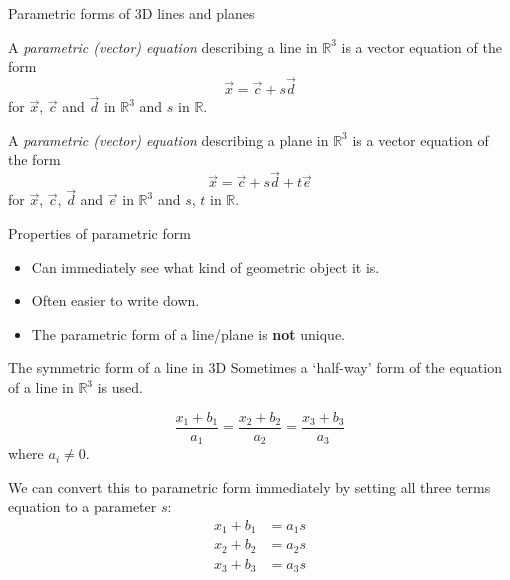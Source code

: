 \documentclass{beamer}
\begin{document}
\begin{frame}{Parametric forms of 3D lines and planes}
  \begin{definition}
    A \emph{parametric (vector) equation} describing a line in $\mathbb R^3$ is a vector equation of the form
    \begin{equation*}
      \vec{x} = \vec{c}+s\vec{d}
    \end{equation*}
    for $\vec{x}$, $\vec{c}$ and $\vec{d}$ in $\mathbb R^3$ and $s$ in $\mathbb R$.
  \end{definition}\vfill
  \begin{definition}
    A \emph{parametric (vector) equation} describing a plane in $\mathbb R^3$ is a vector equation of the form
    \begin{equation*}
      \vec{x} = \vec{c}+s\vec{d}+t\vec{e}
    \end{equation*}
    for $\vec{x}$, $\vec{c}$, $\vec{d}$ and $\vec{e}$ in $\mathbb R^3$ and $s$, $t$ in $\mathbb R$.
  \end{definition}
\end{frame}

\begin{frame}{Properties of parametric form}
  \begin{itemize}
  \item Can immediately see what kind of geometric object it is.\vfill
  \item Often easier to write down.\vfill
  \item The parametric form of a line/plane is {\bf not} unique.
  \end{itemize}
\end{frame}

\begin{frame}{The symmetric form of a line in 3D}
  Sometimes a `half-way' form of the equation of a line in $\mathbb R^3$ is used.\vfill
  \begin{definition}
    \begin{equation*}
      \frac{x_1+b_1}{a_1} = \frac{x_2+b_2}{a_2} =\frac{x_3+b_3}{a_3}
    \end{equation*}
    where $a_i\neq 0$.
  \end{definition}\vfill
  We can convert this to parametric form immediately by setting all three terms equation to a parameter $s$:
  \begin{align*}
    x_1+b_1&= a_1s\\
    x_2+b_2&= a_2s\\
    x_3+b_3&= a_3s
  \end{align*}
\end{frame}
\end{document}
